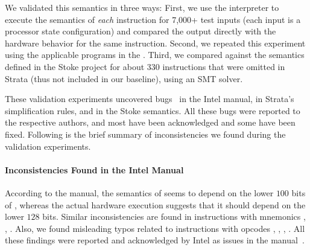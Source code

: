 We validated this semantics in three ways:
%
First, we use the \K interpreter to execute the semantics of \emph{each} instruction for 7,000+ test inputs (each input is a processor state configuration) and compared the output directly with the hardware behavior for the same instruction.
%
Second, we repeated this experiment using the applicable programs in the .  %
%
Third, we compared against the semantics defined in the Stoke project for about 330 instructions that were omitted in Strata (thus not included in our baseline), using an SMT solver.

These validation experiments uncovered bugs~\cite{BugIntel,BugStoke983,BugStoke986} in the Intel manual, in Strata's simplification rules, and in the Stoke semantics.  All these bugs were reported to the respective authors, and most have been acknowledged and some have been fixed. Following is the brief summary of inconsistencies we found during the validation experiments.

\paragraph{Inconsistencies Found in the Intel Manual}
According to the manual, the semantics of     seems to depend on the lower $100$ bits of , whereas the actual hardware execution suggests that it should depend on the lower $128$ bits. Similar inconsistencies are found in instructions with mnemonics , , .
Also, we found misleading typos related to instructions with opcodes , , , .    
All these findings were reported and acknowledged by Intel as issues in the manual~\cite{BugIntel}.

